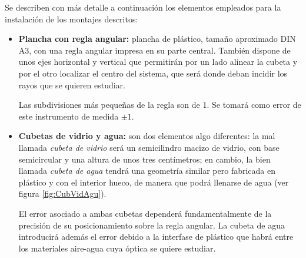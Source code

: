 \documentclass[a4paper,twocolumn]{article}
\begin{document}
        Se describen con más detalle a continuación los elementos empleados para la instalación de los montajes descritos:
        
        \begin{itemize}
            \item \textbf{Plancha con regla angular:} plancha de plástico, tamaño aproximado DIN A3, con una regla angular impresa en su parte central. También dispone de unos ejes horizontal y vertical que permitirán por un lado alinear la cubeta y por el otro localizar el centro del sistema, que será donde deban incidir los rayos que se quieren estudiar.
            
            Las subdivisiones más pequeñas de la regla son de 1\textdegree. Se tomará como error de este instrumento de medida $\pm 1$\textdegree.

            \item \textbf{Cubetas de vidrio y agua:} son dos elementos algo diferentes: la mal llamada \textit{cubeta de vidrio} será un semicilindro macizo de vidrio, con base semicircular y una altura de unos tres centímetros; en cambio, la bien llamada \textit{cubeta de agua} tendrá una geometría similar pero fabricada en plástico y con el interior hueco, de manera que podrá llenarse de agua (ver figura \ref{fig:CubVidAgu}).
            
            El error asociado a ambas cubetas dependerá fundamentalmente de la precisión de su posicionamiento sobre la regla angular. La cubeta de agua introducirá además el error debido a la interfase de plástico que habrá entre los materiales aire-agua cuya óptica se quiere estudiar.


\end{itemize}
\end{document}
